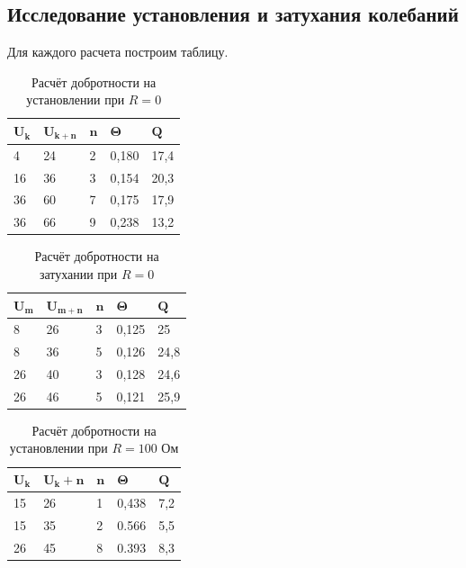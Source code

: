 \documentclass[10pt,a4paper]{article}
\begin{document}
    \subsection{Исследование установления и затухания колебаний}

Для каждого расчета построим таблицу.

\begin{table}[h!]
	\centering
	\begin{tabular}{|l|l|l|l|l|}
		\hline
		$\mathbf{U_k}$ & $\mathbf{U_{k+n}}$ & $\mathbf{n}$ & $\mathbf{\Theta}$ & $\mathbf{Q}$  \\ \hline
		4      & 24    & 2   & 0,180   & 17,4 \\ \hline
		16    & 36    & 3   & 0,154   & 20,3 \\ \hline
		36   & 60     & 7   & 0,175   & 17,9 \\ \hline
		36   & 66     & 9   & 0,238   & 13,2 \\ \hline
	\end{tabular}
\caption{Расчёт добротности на установлении при $R=0$}
\end{table}

\begin{table}[h!]
	\centering
	\begin{tabular}{|l|l|l|l|l|}
		\hline
		$\mathbf{U_m}$ & $\mathbf{U_{m+n}}$ & $\mathbf{n}$ & $\mathbf{\Theta}$ & $\mathbf{Q}$ \\ \hline
		8         & 26              & 3           & 0,125            & 25         \\ \hline
	    8         & 36              & 5           & 0,126            & 24,8         \\ \hline
		26       & 40              & 3            & 0,128           & 24,6         \\ \hline
		26       & 46              & 5            & 0,121           & 25,9          \\ \hline
	\end{tabular}
\caption{Расчёт добротности на затухании при $R=0$}
\end{table}

\begin{table}[h!]
	\centering
	\begin{tabular}{|l|l|l|l|l|}
		\hline
		$\mathbf{U_k}$ & $\mathbf{U_k+n}$ & $\mathbf{n}$ & $\mathbf{\Theta}$ & $\mathbf{Q}$ \\ \hline
		15         & 26            & 1           &  0,438            & 7,2         \\ \hline
		15         & 35            & 2           & 0.566             & 5,5         \\ \hline
		26         & 45            & 8           & 0.393             & 8,3         \\ \hline
	\end{tabular}
\caption{Расчёт добротности на установлении при $R=100$ Ом}
\end{table}
\end{document}
